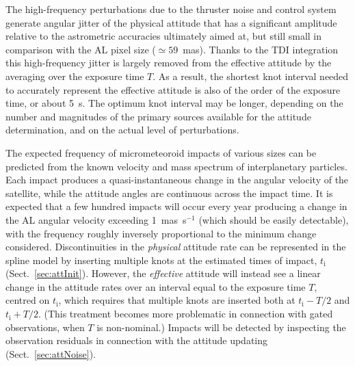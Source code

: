 \documentclass[structabstract]{aa}
\begin{document}
The high-frequency perturbations due to the thruster noise and control system
generate angular jitter of the physical attitude that has a significant amplitude
relative to the astrometric accuracies ultimately aimed at, but still small in
comparison with the AL pixel size ($\simeq 59$~mas). Thanks to the
TDI integration this high-frequency jitter is largely removed from the effective 
attitude by the averaging over the exposure time $T$. As a result, the shortest
knot interval needed to accurately represent the effective attitude is also of 
the order of the exposure time, or about 5~s. The optimum knot interval may 
be longer, depending on the number and magnitudes of the primary sources 
available for the attitude determination, and on the actual level of perturbations.

The expected frequency of micrometeoroid impacts of various sizes can be 
predicted from the known velocity and mass spectrum of interplanetary particles. 
Each impact produces a quasi-instantaneous change in the angular velocity
of the satellite, 
while the attitude angles are continuous across the impact time. It is
expected that a few hundred impacts will occur every year producing a change
in the AL angular velocity exceeding 1~mas~s$^{-1}$ (which should be easily
detectable), with the frequency roughly inversely proportional to the minimum 
change considered. Discontinuities in the \emph{physical} attitude rate can 
be represented in the spline model by inserting multiple knots at the estimated 
times of impact, $t_\text{i}$ (Sect.~\ref{sec:attInit}). However, the \emph{effective} 
attitude will instead see a linear change in the attitude rates over an interval 
equal to the exposure time $T$, centred on $t_\text{i}$, which requires that 
multiple knots are inserted both at $t_\text{i}-T/2$ and $t_\text{i}+T/2$. 
(This treatment becomes more problematic in connection with gated observations, 
when $T$ is non-nominal.)  
Impacts will be detected by inspecting the observation residuals in connection
with the attitude updating (Sect.~\ref{sec:attNoise}).  
\end{document}
